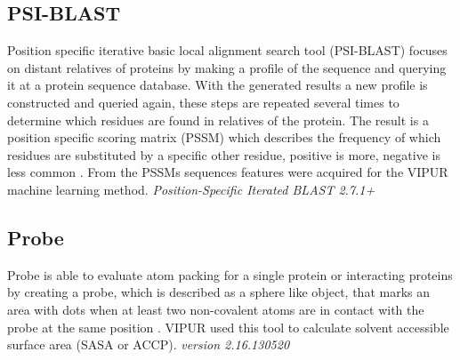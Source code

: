 \subsection{PSI-BLAST}
Position specific iterative basic local alignment search tool (PSI-BLAST) focuses on distant relatives of proteins by making a profile of the sequence and querying it at a protein sequence database. With the generated results a new profile is constructed and queried again, these steps are repeated several times to determine which residues are found in relatives of the protein. The result is a position specific scoring matrix (PSSM) which describes the frequency of which residues are substituted by a specific other residue, positive is more, negative is less common \cite{}.
From the PSSMs sequences features were acquired for the VIPUR machine learning method.
\label{subsec:MM_PSI_BLAST}
\newline
\textit{Position-Specific Iterated BLAST 2.7.1+}

\subsection{Probe}
Probe is able to evaluate atom packing for a single protein or interacting proteins by creating a probe, which is described as a sphere like object, that marks an area with dots when at least two non-covalent atoms are in contact with the probe at the same position \cite{}. VIPUR used this tool to calculate solvent accessible surface area (SASA or ACCP).
\label{subsec:MM_Probe}
\newline
\textit{version 2.16.130520}

